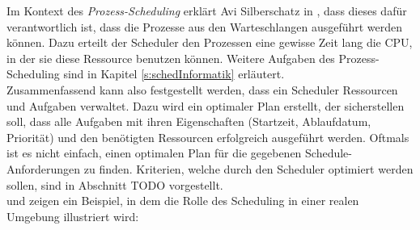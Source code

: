 Im Kontext des \textit{Prozess-Scheduling} erklärt Avi Silberschatz in \cite{asilberschatz}, dass dieses dafür verantwortlich ist, dass die Prozesse aus den Warteschlangen ausgeführt werden können. Dazu erteilt der Scheduler den Prozessen eine gewisse Zeit lang die CPU, in der sie diese Ressource benutzen können. Weitere Aufgaben des Prozess-Scheduling sind in Kapitel \ref{s:schedInformatik} erläutert.\\

Zusammenfassend kann also festgestellt werden, dass ein Scheduler Ressourcen und Aufgaben verwaltet. Dazu wird ein optimaler Plan erstellt, der sicherstellen soll, dass alle Aufgaben mit ihren Eigenschaften (Startzeit, Ablaufdatum, Priorität) und den benötigten Ressourcen erfolgreich ausgeführt werden. Oftmals ist es nicht einfach, einen optimalen Plan für die gegebenen Schedule-Anforderungen zu finden. Kriterien, welche durch den Scheduler optimiert werden sollen, sind in Abschnitt TODO vorgestellt.\\
\cite{mpinedo} und \cite{aagnetis} zeigen ein Beispiel, in dem die Rolle des Scheduling in einer realen Umgebung illustriert wird:
\\
